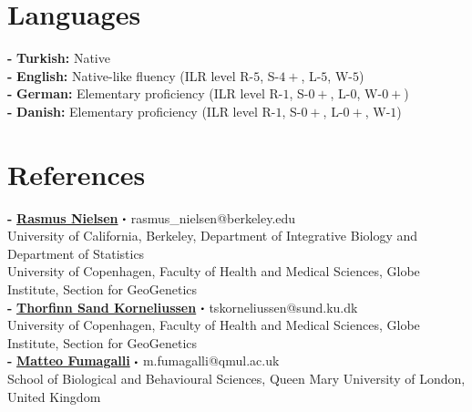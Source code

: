 \documentclass[letterpaper,10.5pt]{article}
\newcommand\sbullet[1][.5]{\mathbin{\vcenter{\hbox{\scalebox{#1}{$\bullet$}}}}}
\begin{document}
 

\section{Languages}
    \textbf{-}  \textbf{Turkish:} Native \\
    \textbf{-}  \textbf{English:} Native-like fluency (ILR level R-$5$, S-$4+$, L-$5$, W-$5$) \\
    \textbf{-}  \textbf{German:} Elementary proficiency (ILR level R-$1$, S-$0+$, L-$0$, W-$0+$) \\
    \textbf{-}  \textbf{Danish:} Elementary proficiency (ILR level R-$1$, S-$0+$, L-$0+$, W-$1$) \\

\section{References}

\textbf{-} \textbf{\href{https://scholar.google.com/citations?user=PySbfcEAAAAJ&hl=en&oi=ao}{Rasmus Nielsen}}  $\sbullet[.5]$ rasmus\_nielsen@berkeley.edu \\
University of California, Berkeley, Department of Integrative Biology and Department of Statistics \\
University of Copenhagen, Faculty of Health and Medical Sciences, Globe Institute, Section for GeoGenetics \\

\textbf{-} \textbf{\href{https://scholar.google.com/citations?hl=en&user=-YNWF4AAAAAJ}{Thorfinn Sand Korneliussen}}   $\sbullet[.5]$ tskorneliussen@sund.ku.dk \\
University of Copenhagen, Faculty of Health and Medical Sciences, Globe Institute, Section for GeoGenetics \\

\textbf{-} \textbf{\href{https://scholar.google.com/citations?hl=en&user=rQhiTmYAAAAJ}{Matteo Fumagalli}}   $\sbullet[.5]$  m.fumagalli@qmul.ac.uk  \\
School of Biological and Behavioural Sciences, Queen Mary University of London, United Kingdom \\
\end{document}
